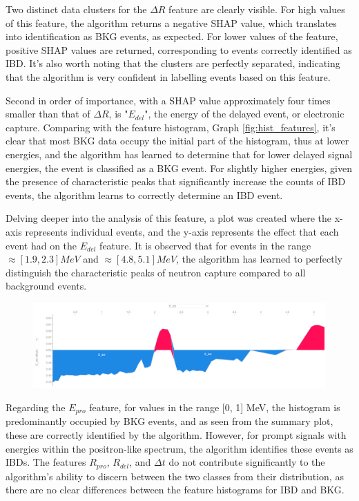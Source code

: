 Two distinct data clusters for the $\Delta R$ feature are clearly visible. For high values of this feature, the algorithm returns a negative SHAP value, which translates into identification as BKG events, as expected. For lower values of the feature, positive SHAP values are returned, corresponding to events correctly identified as IBD. It's also worth noting that the clusters are perfectly separated, indicating that the algorithm is very confident in labelling events based on this feature.

Second in order of importance, with a SHAP value approximately four times smaller than that of $\Delta R$, is "$E_{del}$", the energy of the delayed event, or electronic capture. Comparing with the feature histogram, Graph \ref{fig:hist_features}, it's clear that most BKG data occupy the initial part of the histogram, thus at lower energies, and the algorithm has learned to determine that for lower delayed signal energies, the event is classified as a BKG event. For slightly higher energies, given the presence of characteristic peaks that significantly increase the counts of IBD events, the algorithm learns to correctly determine an IBD event. 

Delving deeper into the analysis of this feature, a plot was created where the x-axis represents individual events, and the y-axis represents the effect that each event had on the $E_{del}$ feature. It is observed that for events in the range $\approx[1.9, 2.3] MeV$ and $\approx[4.8, 5.1] MeV$, the algorithm has learned to perfectly distinguish the characteristic peaks of neutron capture compared to all background events.

\begin{figure}[h!]
	\centering
	\includegraphics[width=\linewidth]{Images/Shap/E_del_force_plot.png}
	\label{fig:E_del_force_plot}
\end{figure}

Regarding the $E_{pro}$ feature, for values in the range [0, 1] MeV, the histogram is predominantly occupied by BKG events, and as seen from the summary plot, these are correctly identified by the algorithm. However, for prompt signals with energies within the positron-like spectrum, the algorithm identifies these events as IBDs. The features $R_{pro}$, $R_{del}$, and $\Delta t$ do not contribute significantly to the algorithm's ability to discern between the two classes from their distribution, as there are no clear differences between the feature histograms for IBD and BKG.


